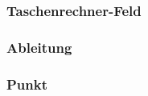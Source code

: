\documentclass[12pt,a4paper]{article}
\newcommand{\project}{/home/jonas/Dokumente/Java-Projekte/GraphingCalculator/src/main/java/de/jonas/graphingcalculator}
\begin{document}
    \newpage

    \subsubsection{Taschenrechner-Feld}
    

    \newpage

    \subsubsection{Ableitung}
    

    \newpage

    \subsubsection{Punkt}
    

    
\end{document}
